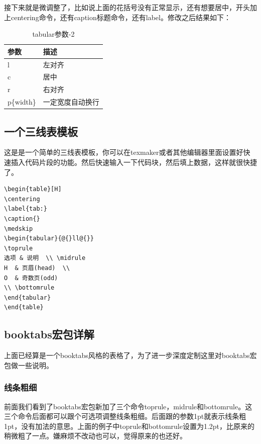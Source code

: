 \documentclass[12pt,oneside]{book}
\begin{document}
\begin{common-format}
接下来就是微调整了，比如说上面的花括号没有正常显示，还有想要居中，开头加上centering命令，还有caption标题命令，还有label。修改之后结果如下：
\begin{table}[H]
\centering
\begin{tabular}{@{}ll@{}}
\toprule[1.2pt]
参数       & 描述       \\ \midrule
l        & 左对齐      \\
c        & 居中       \\
r        & 右对齐      \\
p\{width\} & 一定宽度自动换行 \\ \bottomrule[1.2pt]
\end{tabular}
\caption{tabular参数-2}
\label{tab:tabular参数-2}
\end{table}

\subsection{一个三线表模板}
这是是一个简单的三线表模板，你可以在texmaker或者其他编辑器里面设置好快速插入代码片段的功能。然后快速输入一下代码块，然后填上数据，这样就很快捷了。
\begin{Verbatim}
\begin{table}[H]
\centering
\label{tab:}
\caption{}
\medskip 
\begin{tabular}{@{}ll@{}}
\toprule
选项 & 说明  \\ \midrule
H  & 页眉(head)  \\
O  & 奇数页(odd) 
\\ \bottomrule
\end{tabular}
\end{table}
\end{Verbatim}


\subsection{booktabs宏包详解}
上面已经算是一个booktabs风格的表格了，为了进一步深度定制这里对booktabs宏包做一些说明。

\subsubsection{线条粗细}
前面我们看到了booktabs宏包新加了三个命令toprule，midrule和bottomrule。这三个命令后面都可以跟个可选项调整线条粗细。后面跟的参数1pt就表示线条粗1pt，没有加法的意思。上面的例子中toprule和bottomrule设置为1.2pt，比原来的稍微粗了一点。嫌麻烦不改动也可以，觉得原来的也还好。


\end{common-format}
\end{document}
